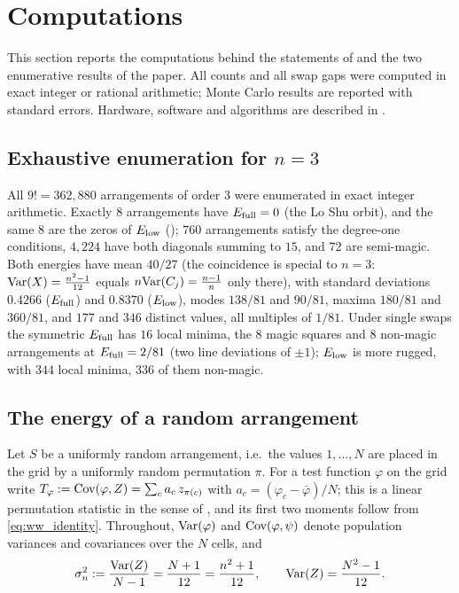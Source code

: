 \section{Computations}
\label{sec:results}

This section reports the computations behind the statements of  and the two enumerative results of the paper.
All counts and all swap gaps were computed in exact integer or rational arithmetic; Monte Carlo results are reported with standard errors.
Hardware, software and algorithms are described in .

\subsection{Exhaustive enumeration for $n=3$}
\label{sec:n3_exhaustive}

All $9!=362{,}880$ arrangements of order $3$ were enumerated in exact integer arithmetic.
Exactly $8$ arrangements have $E_{\mathrm{full}}=0$ (the Lo Shu orbit), and the same $8$ are the zeros of $E_{\mathrm{low}}$ ();
$760$ arrangements satisfy the degree-one conditions, $4{,}224$ have both diagonals summing to $15$, and $72$ are semi-magic.
Both energies have mean $40/27$ (the coincidence is special to $n=3$: $\mathrm{Var}(X)=\frac{n^2-1}{12}$ equals $n\mathrm{Var}(C_j)=\frac{n-1}{n}$
only there), with standard deviations $0.4266$ ($E_{\mathrm{full}}$) and $0.8370$ ($E_{\mathrm{low}}$), modes $138/81$ and $90/81$, maxima
$180/81$ and $360/81$, and $177$ and $346$ distinct values, all multiples of $1/81$.
Under single swaps the symmetric $E_{\mathrm{full}}$ has $16$ local minima, the $8$ magic squares and $8$ non-magic arrangements at
$E_{\mathrm{full}}=2/81$ (two line deviations of $\pm1$); $E_{\mathrm{low}}$ is more rugged, with $344$ local minima, $336$ of them non-magic.

\subsection{The energy of a random arrangement}
\label{sec:random_energy}

Let $S$ be a uniformly random arrangement, i.e.\ the values $1,\dots,N$ are placed in the
grid by a uniformly random permutation $\pi$. For a test function $\varphi$ on the grid write
$T_\varphi := \mathrm{Cov}(\varphi,Z) = \sum_{c} a_c\, z_{\pi(c)}$ with $a_c=(\varphi_c-\bar\varphi)/N$;
this is a linear permutation statistic in the sense of , and its first two moments
follow from \eqref{eq:ww_identity}. Throughout, $\mathrm{Var}(\varphi)$ and $\mathrm{Cov}(\varphi,\psi)$ denote
population variances and covariances over the $N$ cells, and
\[
\sigma_n^2 := \frac{\mathrm{Var}(Z)}{N-1} = \frac{N+1}{12} = \frac{n^2+1}{12},
\qquad \mathrm{Var}(Z)=\frac{N^2-1}{12}.
\]

